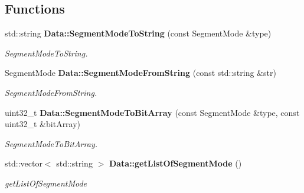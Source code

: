 \subsection*{Functions}
\begin{DoxyCompactItemize}
\item 
std\+::string \textbf{ Data\+::\+Segment\+Mode\+To\+String} (const Segment\+Mode \&type)
\begin{DoxyCompactList}\small\item\em Segment\+Mode\+To\+String. \end{DoxyCompactList}\item 
Segment\+Mode \textbf{ Data\+::\+Segment\+Mode\+From\+String} (const std\+::string \&str)
\begin{DoxyCompactList}\small\item\em Segment\+Mode\+From\+String. \end{DoxyCompactList}\item 
uint32\+\_\+t \textbf{ Data\+::\+Segment\+Mode\+To\+Bit\+Array} (const Segment\+Mode \&type, const uint32\+\_\+t \&bit\+Array)
\begin{DoxyCompactList}\small\item\em Segment\+Mode\+To\+Bit\+Array. \end{DoxyCompactList}\item 
std\+::vector$<$ std\+::string $>$ \textbf{ Data\+::get\+List\+Of\+Segment\+Mode} ()
\begin{DoxyCompactList}\small\item\em get\+List\+Of\+Segment\+Mode \end{DoxyCompactList}\end{DoxyCompactItemize}
